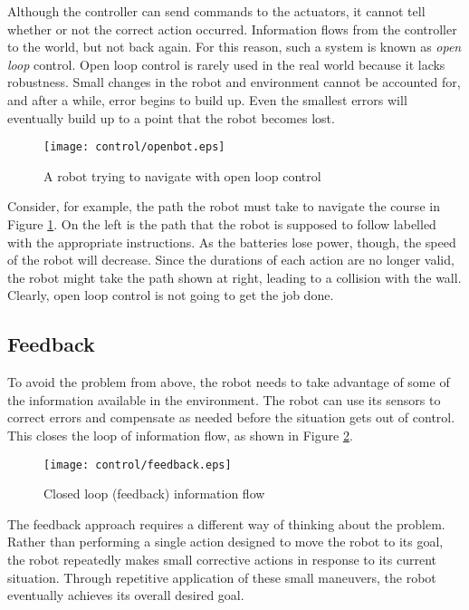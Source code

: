 Although the controller can send commands to the actuators, it cannot
tell whether or not the correct action occurred. Information flows from
the controller to the world, but not back again. For this reason, such a
system is known as {\it open loop} control. Open loop control is rarely
used in the real world because it lacks robustness. Small changes in the
robot and environment cannot be accounted for, and after a while, error
begins to build up. Even the smallest errors will eventually build up to
a point that the robot becomes lost.

\begin{figure}[htbp]
\begin{center}
\texttt{[image: control/openbot.eps]}
 \caption{A robot trying to navigate with open loop control}
 \label{openbot}
\end{center}
\end{figure}

Consider, for example, the path the robot must take to navigate the
course in Figure \ref{openbot}. On the left is the path that the robot
is supposed to follow labelled with the appropriate instructions. As
the batteries lose power, though, the speed of the robot will
decrease. Since the durations of each action are no longer valid, the
robot might take the path shown at right, leading to a collision with
the wall. Clearly, open loop control is not going to get the job done.

\subsection{Feedback}

To avoid the problem from above, the robot needs to take advantage of
some of the information available in the environment. The robot can
use its sensors to correct errors and compensate as needed before the
situation gets out of control. This closes the loop of information
flow, as shown in Figure \ref{feedback}.

\begin{figure}[htbp]
\begin{center}
\texttt{[image: control/feedback.eps]}
 \caption{Closed loop (feedback) information flow}
 \label{feedback}
\end{center}
\end{figure}

The feedback approach requires a different way of thinking about the
problem. Rather than performing a single action designed to move the
robot to its goal, the robot repeatedly makes small corrective actions
in response to its current situation. Through repetitive application
of these small maneuvers, the robot eventually achieves its overall
desired goal.

